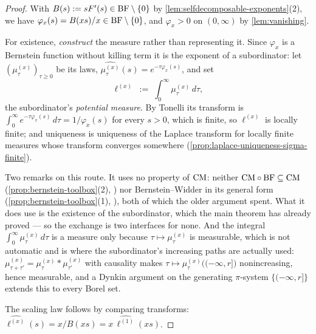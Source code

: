 \begin{proof}
\leanok
With $B(s) := sF'(s) \in \mathrm{BF} \setminus \{0\}$ by \ref{lem:selfdecomposable-exponents}(2), we
have $\varphi_x(s) = B(xs)/x \in \mathrm{BF} \setminus \{0\}$, and $\varphi_x > 0$ on $(0,\infty)$ by
\ref{lem:vanishing}.

For existence, \emph{construct} the measure rather than representing it. Since $\varphi_x$ is a
Bernstein function without killing term it is the exponent of a subordinator: let
$(\mu^{(x)}_\tau)_{\tau \ge 0}$ be its laws, $\widehat{\mu^{(x)}_\tau}(s) =
e^{-\tau \varphi_x(s)}$, and set
\[
  \ell^{(x)} \;:=\; \int_0^\infty \mu^{(x)}_\tau \, d\tau,
\]
the subordinator's \emph{potential measure}. By Tonelli its transform is
$\int_0^\infty e^{-\tau\varphi_x(s)}\,d\tau = 1/\varphi_x(s)$ for every $s > 0$, which is finite,
so $\ell^{(x)}$ is locally finite; and uniqueness is uniqueness of the Laplace transform for
locally finite measures whose transform converges somewhere (\ref{prop:laplace-uniqueness-sigma-finite}).

Two remarks on this route. It uses no property of $\mathrm{CM}$: neither
$\mathrm{CM} \circ \mathrm{BF} \subseteq \mathrm{CM}$ (\ref{prop:bernstein-toolbox}(2), ) nor Bernstein--Widder
in its general form (\ref{prop:bernstein-toolbox}(1), ), both of which the older
argument spent. What it does use is the existence of the subordinator, which the main theorem has
already proved --- so the exchange is two interfaces for none. And the integral
$\int_0^\infty \mu^{(x)}_\tau\,d\tau$ is a measure only because $\tau \mapsto \mu^{(x)}_\tau$ is
measurable, which is not automatic and is where the subordinator's increasing paths are actually
used: $\mu^{(x)}_{\tau+\tau'} = \mu^{(x)}_\tau * \mu^{(x)}_{\tau'}$ with causality makes
$\tau \mapsto \mu^{(x)}_\tau\bigl((-\infty, r]\bigr)$ nonincreasing, hence measurable, and a
Dynkin argument on the generating $\pi$-system $\{(-\infty,r]\}$ extends this to every Borel set.

The scaling law follows by comparing transforms:
$\widehat{\ell^{(x)}}(s) = x/B(xs) = x\,\widehat{\ell^{(1)}}(xs)$.
\end{proof}

